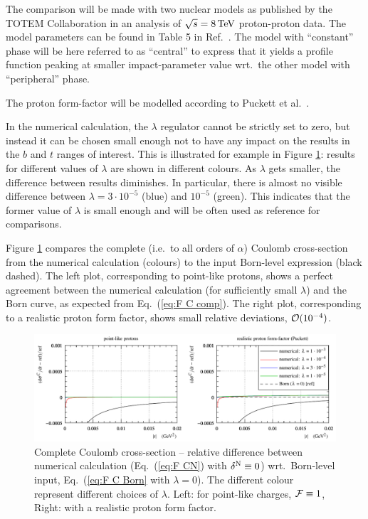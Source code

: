 \documentclass[pdftex,twocolumn,epjc3]{svjour3}
\def\un#1{\,{\rm #1}}
\begin{document}
The comparison will be made with two nuclear models as published by the TOTEM Collaboration in an analysis of $\sqrt s = 8\un{TeV}$ proton-proton data. The model parameters can be found in Table 5 in Ref.~\cite{totem-8tev-1km}. The model with ``constant'' phase will be here referred to as ``central'' to express that it yields a profile function peaking at smaller impact-parameter value wrt.~the other model with ``peripheral'' phase.

The proton form-factor will be modelled according to Puckett et al.~\cite{puckett}.

In the numerical calculation, the $\lambda$ regulator cannot be strictly set to zero, but instead it can be chosen small enough not to have any impact on the results in the $b$ and $t$ ranges of interest. This is illustrated for example in Figure \ref{f:sig C}: results for different values of $\lambda$ are shown in different colours. As $\lambda$ gets smaller, the difference between results diminishes. In particular, there is almost no visible difference between $\lambda = 3\cdot 10^{-5}$ (blue) and $10^{-5}$ (green). This indicates that the former value of $\lambda$ is small enough and will be often used as reference for comparisons.

Figure \ref{f:sig C} compares the complete (i.e.~to all orders of $\alpha$) Coulomb cross-section from the numerical calculation (colours) to the input Born-level expression (black dashed). The left plot, corresponding to point-like protons, shows a perfect agreement between the numerical calculation (for sufficiently small $\lambda$) and the Born curve, as expected from Eq.~(\ref{eq:F C comp}). The right plot, corresponding to a realistic proton form factor, shows small relative deviations, ${\cal O}(10^{-4})$.

\begin{figure}[h]
\begin{center}
\includegraphics{fig/coul_complete_cmp_lambda_dsdt.pdf}
\caption{Complete Coulomb cross-section -- relative difference between numerical calculation (Eq.~(\ref{eq:F CN}) with $\delta^{\rm N} \equiv 0$) wrt.~Born-level input, Eq.~(\ref{eq:F C Born} with $\lambda = 0$). The different colour represent different choices of $\lambda$. Left: for point-like charges, ${\cal F} \equiv 1$, Right: with a realistic proton form factor.}
\label{f:sig C}
\end{center}
\end{figure}
\end{document}
